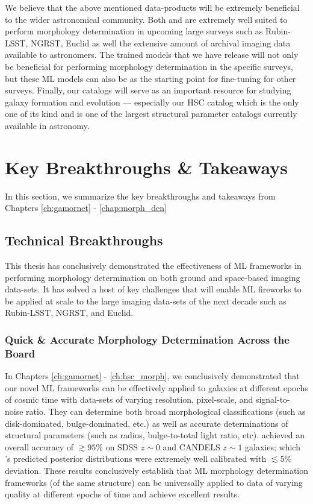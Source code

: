 We believe that the above mentioned data-products will be extremely beneficial to the wider astronomical community. Both \gamornet{} and \gampen{} are extremely well suited to perform morphology determination in upcoming large surveys such as Rubin-LSST, NGRST, Euclid as well the extensive amount of archival imaging data available to astronomers. The trained models that we have release will not only be beneficial for performing morphology determination in the specific surveys, but these ML models can also be as the starting point for fine-tuning for other surveys. Finally, our catalogs will serve as an important resource for studying galaxy formation and evolution --- especially our HSC  catalog which is the only one of its kind and is one of the largest structural parameter catalogs currently available in astronomy. 

\section{Key Breakthroughs \& Takeaways} \label{sec_conc:takeaways}

In this section, we summarize the key breakthroughs and takeaways from Chapters \ref{ch:gamornet} - \ref{chap:morph_den}

\subsection{Technical Breakthroughs} \label{sec_conc:tech_breakthroughts}
This thesis has conclusively demonstrated the effectiveness of ML frameworks in performing morphology determination on both ground and space-based imaging data-sets. It has solved a host of key challenges that will enable ML fireworks to be applied at scale to the large imaging data-sets of the next decade such as Rubin-LSST, NGRST, and Euclid. 

\subsubsection{Quick \& Accurate Morphology Determination Across the Board } 
In Chapters \ref{ch:gamornet} - \ref{ch:hsc_morph}, we conclusively demonstrated that our novel ML frameworks can be effectively applied to galaxies at different epochs of cosmic time with data-sets of varying resolution, pixel-scale, and signal-to-noise ratio. They can determine both broad morphological classifications (such as disk-dominated, bulge-dominated, etc.) as well as accurate determinations of structural parameters (such as radius, bulge-to-total light ratio, etc). \gamornet{} achieved an overall accuracy  of $\gtrsim 95\%$ on SDSS $z\sim0$ and CANDELS $z\sim1$ galaxies; which \gampen{}'s predicted posterior distributions were extremely well calibrated with $\lesssim 5\%$ deviation. These results conclusively establish that ML morphology determination frameworks (of the same structure) can be universally applied to data of varying quality at different epochs of time and achieve excellent results.

